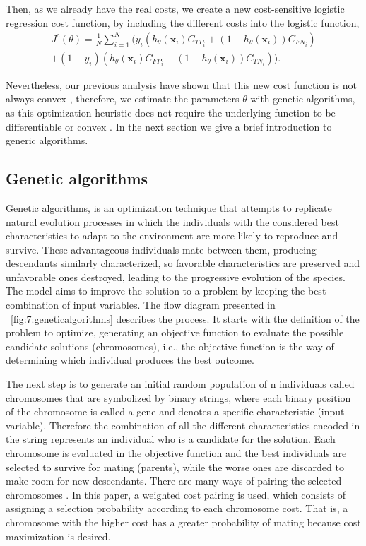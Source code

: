 Then, as we already have the real costs, we create a new cost-sensitive logistic regression cost 
function, by including the different costs into the logistic function,
\begin{align}\label{eq:CSLR}
  J^c(\theta)=\frac{1}{N} \sum_{i=1}^{N} \bigg( y_i(h_\theta(\mathbf{x}_i) C_{TP_i} + 
  (1-h_\theta(\mathbf{x}_i))C_{FN_i})  \nonumber\\ 
  +(1-y_i)(h_\theta(\mathbf{x}_i) C_{FP_i} + (1-h_\theta(\mathbf{x}_i))C_{TN_i}) \bigg).
\end{align}

Nevertheless, our previous analysis have shown that this new cost function is not always convex 
\citep{CorreaBahnsen2014b}, therefore, we estimate the parameters $\theta$ with genetic algorithms, 
as this optimization heuristic does not require the underlying function to be differentiable or 
convex \citep{Haupt2004}. In the next section we give a brief introduction to generic algorithms.


\subsection{Genetic algorithms}
\label{sec:7:ga}

Genetic algorithms, is an optimization technique that attempts to replicate natural evolution 
processes in which the individuals with the considered best characteristics to adapt to the 
environment are more likely to reproduce and survive. These advantageous individuals mate between 
them, producing descendants similarly characterized, so favorable characteristics are preserved and 
unfavorable ones destroyed, leading to the progressive evolution of the species. The model aims 
to improve the solution to a problem by keeping the best combination of input variables. The 
flow diagram presented in \figurename{~\ref{fig:7:geneticalgorithms}} describes the process. It 
starts with the definition of the problem to optimize, generating an objective function to evaluate 
the possible candidate solutions (chromosomes), i.e., the objective function is the way of 
determining which individual produces the best outcome. 

The next step is to generate an initial random population of n individuals called chromosomes that 
are symbolized by binary strings, where each binary position of the chromosome is called a gene and 
denotes a specific characteristic (input variable). Therefore the combination of all the different 
characteristics encoded in the string represents an individual who is a candidate for the solution.
Each chromosome is evaluated in the objective function and the best individuals are selected to 
survive for mating (parents), while the worse ones are discarded to make room for new descendants.  
There are many ways of pairing the selected chromosomes \citep{Haupt2004}. In this paper, a 
weighted 
cost pairing is used, which consists of assigning a selection probability according to each 
chromosome cost. That is, a chromosome with the higher cost has a greater probability of mating 
because cost maximization is desired.

